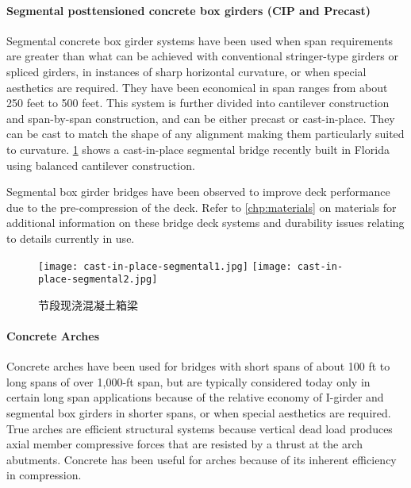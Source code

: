 \paragraph{Segmental posttensioned concrete box girders (CIP and Precast)}

Segmental concrete box girder systems have been used when span requirements are greater than what can be
achieved with conventional stringer-type girders or spliced girders, in instances of sharp horizontal curvature, or
when special aesthetics are required. They have been economical in span ranges from about 250 feet to 500 feet.
This system is further divided into cantilever construction and span-by-span construction, and can be either precast or
cast-in-place. They can be cast to match the shape of any alignment making them particularly suited to curvature.
\cref{fig:cast-in-place-segmental} shows a cast-in-place segmental bridge recently built in Florida using balanced cantilever construction.

Segmental box girder bridges have been observed to improve deck performance due to the pre-compression of
the deck. Refer to \cref{chp:materials} on materials for additional information on these bridge deck systems and durability
issues relating to details currently in use.

\begin{figure}
  \texttt{[image: cast-in-place-segmental1.jpg]}\hfill
  \texttt{[image: cast-in-place-segmental2.jpg]}
  \caption{节段现浇混凝土箱梁}
  \label{fig:cast-in-place-segmental}
\end{figure}

\paragraph{Concrete Arches}

Concrete arches have been used for bridges with short spans of about 100 ft to long spans of over 1,000-ft span,
but are typically considered today only in certain long span applications because of the relative economy of I-girder
and segmental box girders in shorter spans, or when special aesthetics are required. True arches are efficient
structural systems because vertical dead load produces axial member compressive forces that are resisted by a thrust
at the arch abutments. Concrete has been useful for arches because of its inherent efficiency in compression.


